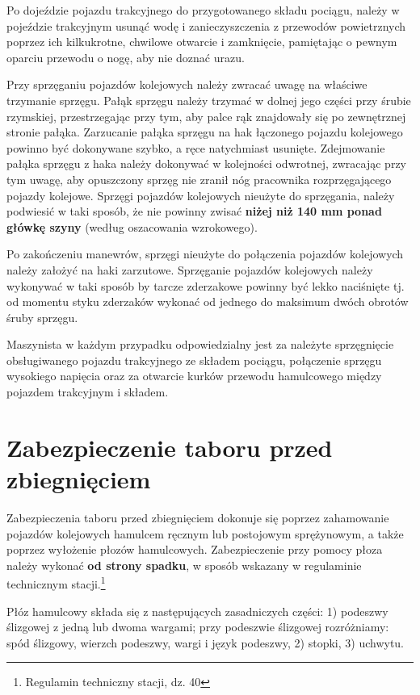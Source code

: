 Po dojeździe pojazdu trakcyjnego do przygotowanego składu pociągu, należy w pojeździe trakcyjnym usunąć wodę i zanieczyszczenia z przewodów powietrznych poprzez ich kilkukrotne, chwilowe otwarcie i zamknięcie, pamiętając o pewnym oparciu przewodu o nogę, aby nie doznać urazu.

Przy sprzęganiu pojazdów kolejowych należy zwracać uwagę na właściwe trzymanie sprzęgu. Pałąk sprzęgu należy trzymać w dolnej jego części przy śrubie rzymskiej, przestrzegając przy tym, aby palce rąk znajdowały się po zewnętrznej stronie pałąka. Zarzucanie pałąka sprzęgu na hak łączonego pojazdu kolejowego powinno być dokonywane szybko, a ręce natychmiast usunięte. Zdejmowanie pałąka sprzęgu z haka należy dokonywać w kolejności odwrotnej, zwracając przy tym uwagę, aby opuszczony sprzęg nie zranił nóg pracownika rozprzęgającego pojazdy kolejowe. Sprzęgi pojazdów kolejowych nieużyte do sprzęgania, należy podwiesić w taki sposób, że nie powinny zwisać \textbf{niżej niż 140 mm ponad główkę szyny} (według oszacowania wzrokowego). 

Po zakończeniu manewrów, sprzęgi nieużyte do połączenia pojazdów kolejowych należy założyć na haki zarzutowe. Sprzęganie pojazdów kolejowych należy wykonywać w taki sposób by tarcze zderzakowe powinny być lekko naciśnięte tj. od momentu styku zderzaków wykonać od jednego do maksimum dwóch obrotów śruby sprzęgu. 

Maszynista w każdym przypadku odpowiedzialny jest za należyte sprzęgnięcie obsługiwanego pojazdu trakcyjnego ze składem pociągu, połączenie sprzęgu wysokiego napięcia oraz za otwarcie kurków przewodu hamulcowego między pojazdem trakcyjnym i składem. 

\chapter{Zabezpieczenie taboru przed zbiegnięciem}

Zabezpieczenia taboru przed zbiegnięciem dokonuje się poprzez zahamowanie pojazdów kolejowych hamulcem ręcznym lub postojowym sprężynowym, a także poprzez wyłożenie płozów hamulcowych. Zabezpieczenie przy pomocy płoza należy wykonać \textbf{od strony spadku}, w sposób wskazany w regulaminie technicznym stacji.\footnote{Regulamin techniczny stacji, dz. 40}

Płóz hamulcowy składa się z następujących zasadniczych części:
1) podeszwy ślizgowej z jedną lub dwoma wargami; przy podeszwie ślizgowej rozróżniamy: spód ślizgowy, wierzch podeszwy, wargi i język podeszwy,
2) stopki,
3) uchwytu.

